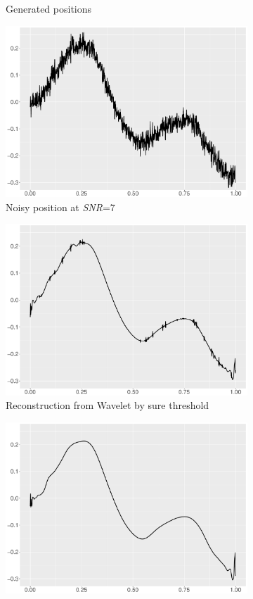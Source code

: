 \begin{figure}
\begin{subfigure}{0.45\textwidth}
    \caption{Generated positions}
    \end{subfigure}
    \begin{subfigure}{0.45\textwidth}
    \centering
    \includegraphics[width=\linewidth,height=0.45\textwidth]{Chapters/02TractorSplineTheory/plot/ggplot/ggHeaviSinePositionNoise.pdf}
    \caption{Noisy position at \textit{SNR}=7}
    \end{subfigure}
    \begin{subfigure}{0.45\textwidth}
    \centering
    \includegraphics[width=\linewidth,height=0.45\textwidth]{Chapters/02TractorSplineTheory/plot/ggplot/ggHeaviSineSure.pdf}
    \caption{Reconstruction from Wavelet by sure threshold}
    \end{subfigure}
    \begin{subfigure}{0.45\textwidth}
    \centering
    \includegraphics[width=\linewidth,height=0.45\textwidth]{Chapters/02TractorSplineTheory/plot/ggplot/ggHeaviSineBayes.pdf}

\end{subfigure}
\end{figure}

